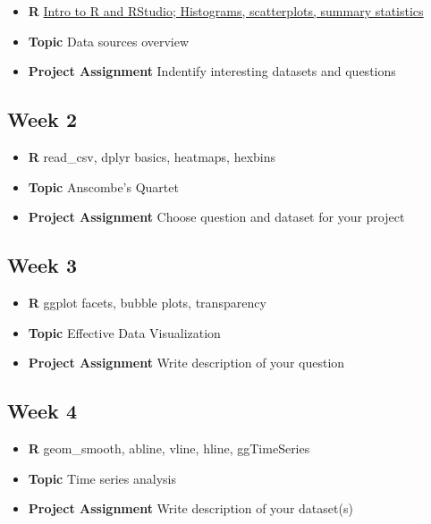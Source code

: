 \documentclass[]{book}
\providecommand{\tightlist}{%
  \setlength{\itemsep}{0pt}\setlength{\parskip}{0pt}}
\begin{document}
\begin{itemize}
\tightlist
\item
  \textbf{R} \protect\hyperlink{intro}{Intro to R and RStudio;
  Histograms, scatterplots, summary statistics}
\item
  \textbf{Topic} Data sources overview
\item
  \textbf{Project Assignment} Indentify interesting datasets and
  questions
\end{itemize}

\subsection*{Week 2}\label{week-2}

\begin{itemize}
\tightlist
\item
  \textbf{R} read\_csv, dplyr basics, heatmaps, hexbins
\item
  \textbf{Topic} Anscombe's Quartet
\item
  \textbf{Project Assignment} Choose question and dataset for your
  project
\end{itemize}

\subsection*{Week 3}\label{week-3}

\begin{itemize}
\tightlist
\item
  \textbf{R} ggplot facets, bubble plots, transparency
\item
  \textbf{Topic} Effective Data Visualization
\item
  \textbf{Project Assignment} Write description of your question
\end{itemize}

\subsection*{Week 4}\label{week-4}

\begin{itemize}
\tightlist
\item
  \textbf{R} geom\_smooth, abline, vline, hline, ggTimeSeries
\item
  \textbf{Topic} Time series analysis
\item
  \textbf{Project Assignment} Write description of your dataset(s)
\end{itemize}
\end{document}
